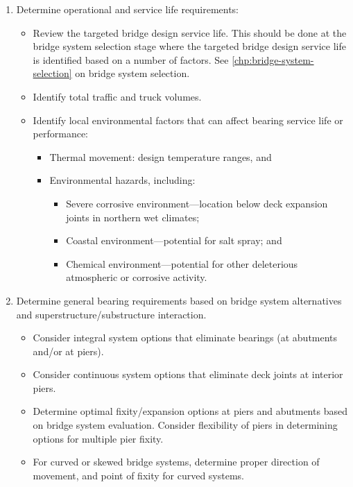 \begin{enumerate}[label=步骤 1.\arabic*,itemindent=4em]
  \item Determine operational and service life requirements:
  \begin{itemize}
    \item Review the targeted bridge design service life. This should be done at the bridge system selection stage where the targeted bridge design service life is identified based on a number of factors. See \cref{chp:bridge-system-selection} on bridge system selection.
    \item Identify total traffic and truck volumes.
    \item Identify local environmental factors that can affect bearing service life or performance:
    \begin{itemize}
      \item Thermal movement: design temperature ranges, and
      \item Environmental hazards, including:
      \begin{itemize}
        \item Severe corrosive environment—location below deck expansion joints in northern wet climates;
        \item Coastal environment—potential for salt spray; and
        \item Chemical environment—potential for other deleterious atmospheric or corrosive
        activity.
      \end{itemize}
    \end{itemize}
  \end{itemize}
  \item Determine general bearing requirements based on bridge system alternatives and superstructure/substructure interaction.
  \begin{itemize}
    \item Consider integral system options that eliminate bearings (at abutments and/or at piers).
    \item Consider continuous system options that eliminate deck joints at interior piers.
    \item Determine optimal fixity/expansion options at piers and abutments based on bridge system evaluation. Consider flexibility of piers in determining options for multiple pier fixity.
    \item For curved or skewed bridge systems, determine proper direction of movement, and point of fixity for curved systems.
  \end{itemize}

\end{enumerate}
